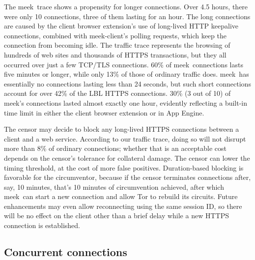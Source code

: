 \documentclass[conference]{IEEEtran}
\def\meekclient{\mbox{meek-client}}
\def\meek{meek}
\begin{document}
The \meek\ trace shows a propensity for longer connections.
Over 4.5 hours, there were only 10 connections,
three of them lasting for an hour.
The long connections are caused by the client browser extension's
use of long-lived HTTP keepalive connections,
combined with \meekclient's polling requests,
which keep the connection from becoming idle.
The traffic trace represents the browsing of hundreds of web sites
and thousands of HTTPS transactions, but they all
occurred over just a few TCP/TLS connections.
60\% of \meek\ connections lasts five minutes or longer,
while only 13\% of those of ordinary traffic does.
\meek\ has essentially no connections lasting less than 24 seconds,
but such short connections account for over 42\% of the LBL HTTPS connections.
30\% (3 out of 10) of \meek's connections lasted almost exactly one hour,
evidently reflecting a built-in time limit in either the client browser extension
or in App Engine.

The censor may decide to block any long-lived HTTPS connections between
a client and a web service.
According to our traffic trace, doing so will not disrupt more than 8\% of ordinary connections;
whether that is an acceptable cost depends on the censor's
tolerance for collateral damage.
The censor can lower the timing threshold, at the cost of more false positives.
Duration-based blocking is favorable for the circumventor,
because if the censor terminates connections after, say, 10 minutes,
that's 10 minutes of circumvention achieved,
after which \meek\ can start a new connection
and allow Tor to rebuild its circuits.
Future enhancements may even allow reconnecting using the same session ID,
so there will be no effect on the client other than a brief delay
while a new HTTPS connection is established.


\subsection{Concurrent connections}

\end{document}

